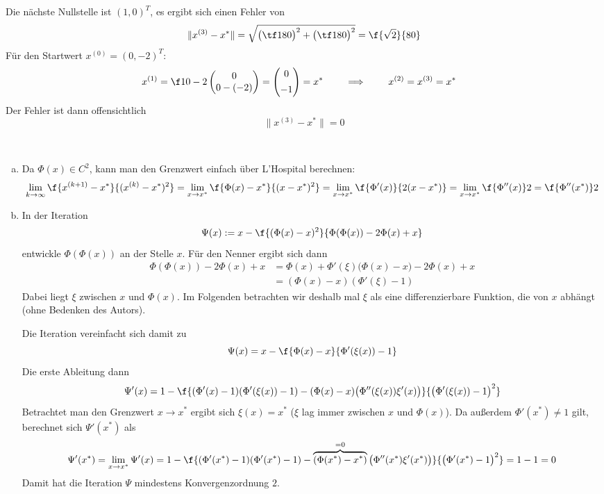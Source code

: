 \documentclass[a4paper]{scrartcl}
\begin{document}
\begin{aufgabe}
\begin{enumerate}[a)]
			Die nächste Nullstelle ist $(1,0)^T$, es ergibt sich einen Fehler von
			\[
				\|x^{(3)} - x^*\| = \sqrt{\big(\tf 1{80}\big)^2 + \big(\tf 1{80}\big)^2} = \f {\sqrt 2}{80}
			\]
			Für den Startwert $x^{(0)} = (0,-2)^T$:
			\begin{align*}
				x^{(1)} &= \f 1{0-2} \begin{pmatrix}
					0 \\ 0 - (-2)
				\end{pmatrix} = \begin{pmatrix}
					0 \\[0.4em]
					-1
				\end{pmatrix} = x^* \qquad \implies \qquad 
				x^{(2)} = x^{(3)} = x^*
			\end{align*}
			Der Fehler ist dann offensichtlich
			\[
				\|x^{(3)} -x^*\| = 0
			\]
	\end{enumerate}
\end{aufgabe}

\begin{aufgabe}~

	\begin{enumerate}[a)]
		\item
			Da $\Phi(x) \in C^2$, kann man den Grenzwert einfach über L'Hospital berechnen:  
			\begin{align*}
				\lim_{k\to \infty} \f {x^{(k+1)}-x^*}{(x^{(k)}-x^*)^2}
				= \lim_{x \to x^*} \f {\Phi(x) - x^*}{(x - x^*)^2} 
				= \lim_{x \to x^*} \f {\Phi'(x)}{2(x-x^*)}
				= \lim_{x \to x^*} \f {\Phi''(x)}2
				= \f {\Phi''(x^*)}2
			\end{align*}
		\item
			In der Iteration
			\[
				\Psi(x) := x - \f {(\Phi(x) - x)^2}{\Phi(\Phi(x)) - 2\Phi(x) + x}
			\]
			entwickle $\Phi(\Phi(x))$ an der Stelle $x$.
			Für den Nenner ergibt sich dann
			\begin{align*}
				\Phi(\Phi(x)) - 2 \Phi(x) + x
				&= \Phi(x) + \Phi'(\xi)\Big(\Phi(x)-x\Big) - 2 \Phi(x) + x \\
				&= (\Phi(x) - x)(\Phi'(\xi) - 1)
			\end{align*}
			Dabei liegt $\xi$ zwischen $x$ und $\Phi(x)$.
			Im Folgenden betrachten wir deshalb mal $\xi$ als eine differenzierbare Funktion, die von $x$ abhängt (ohne Bedenken des Autors).

			Die Iteration vereinfacht sich damit zu
			\[
				\Psi(x) = x - \f {\Phi(x) - x}{\Phi'(\xi(x)) - 1}
			\]
			Die erste Ableitung dann
			\[
				\Psi'(x) = 1 - \f{(\Phi'(x)-1)(\Phi'(\xi(x))-1) - (\Phi(x) - x)\big(\Phi''(\xi(x)) \xi'(x) \big)}{\big(\Phi'(\xi(x))-1\big)^2}
			\]
			Betrachtet man den Grenzwert $x \to x^*$ ergibt sich $\xi(x) = x^*$ ($\xi$ lag immer zwischen $x$ und $\Phi(x)$).
			Da außerdem $\Phi'(x^*) \neq 1$ gilt, berechnet sich $\Psi'(x^*)$ als
			\[
				\Psi'(x^*) = \lim_{x\to x^*}\Psi'(x) = 1 - \f{(\Phi'(x^*)-1)(\Phi'(x^*)-1) - \overbrace{(\Phi(x^*) - x^*)}^{=0}\big(\Phi''(x^*) \xi'(x^*) \big)}{\big(\Phi'(x^*)-1\big)^2}
				= 1 - 1 = 0
			\]
			Damit hat die Iteration $\Psi$ mindestens Konvergenzordnung $2$.
	\end{enumerate}

\end{aufgabe}
\end{document}
